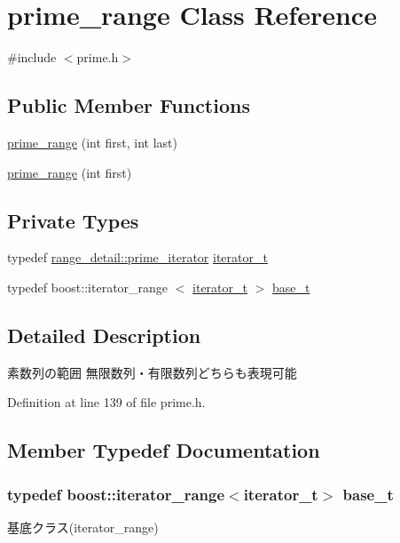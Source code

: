 \hypertarget{classyuh_1_1prime__range}{\section{prime\-\_\-range \-Class \-Reference}
\label{d5/d41/classyuh_1_1prime__range}
}


{\ttfamily \#include $<$prime.\-h$>$}

\subsection*{\-Public \-Member \-Functions}
\begin{DoxyCompactItemize}
\item 
\hyperlink{classyuh_1_1prime__range_aae62519f4eaff67463c1d2cb32e6e2fc}{prime\-\_\-range} (int first, int last)
\item 
\hyperlink{classyuh_1_1prime__range_ae1d6e243b47cf06c4c4b4cdc06ec2328}{prime\-\_\-range} (int first)
\end{DoxyCompactItemize}
\subsection*{\-Private \-Types}
\begin{DoxyCompactItemize}
\item 
typedef \*
\hyperlink{classyuh_1_1range__detail_1_1prime__iterator}{range\-\_\-detail\-::prime\-\_\-iterator} \hyperlink{classyuh_1_1prime__range_a4906d40c1f976001edeeb74a34231811}{iterator\-\_\-t}
\item 
typedef boost\-::iterator\-\_\-range\*
$<$ \hyperlink{classyuh_1_1prime__range_a4906d40c1f976001edeeb74a34231811}{iterator\-\_\-t} $>$ \hyperlink{classyuh_1_1prime__range_a9d51b0fc63206906184824c5b08403b2}{base\-\_\-t}
\end{DoxyCompactItemize}


\subsection{\-Detailed \-Description}
素数列の範囲 無限数列・有限数列どちらも表現可能 

\-Definition at line 139 of file prime.\-h.



\subsection{\-Member \-Typedef \-Documentation}
\hypertarget{classyuh_1_1prime__range_a9d51b0fc63206906184824c5b08403b2}{
\subsubsection[{base\-\_\-t}]{\setlength{\rightskip}{0pt plus 5cm}typedef boost\-::iterator\-\_\-range$<${\bf iterator\-\_\-t}$>$ {\bf base\-\_\-t}}}\label{d5/d41/classyuh_1_1prime__range_a9d51b0fc63206906184824c5b08403b2}
基底クラス(iterator\-\_\-range) 

